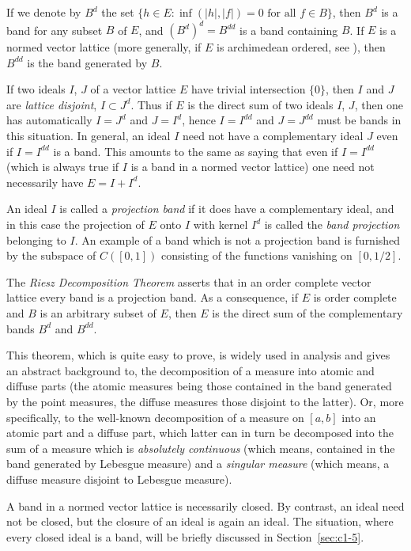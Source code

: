 If we denote by $ B^{d} $ the set $ \{h \in E \colon \inf(|h|,|f|) = 0 \text{ for all } f \in B\} $, then $ B^{d} $ is a band for any subset $ B $ of $ E $, and $ (B^{d})^{d} = B^{dd} $ is a band containing $ B $.
If $ E $ is a normed vector lattice (more generally, if $ E $ is archimedean ordered, see \eg \citet{schaefer:1974}), then $ B^{dd} $ is the band generated by $ B $.

If two ideals $ I $,  $ J $ of a vector lattice $ E $ have trivial intersection $ \{0\} $, then $ I $ and $ J $ are \emph{lattice disjoint}, \ie $ I \subset J^{d} $.
Thus if $ E $ is the direct sum of two ideals $ I $,  $ J $, then one has automatically $ I = J^{d} $ and $ J = I^{d} $, hence $ I = I^{dd} $ and $ J = J^{dd} $ must be bands in this situation.
In general, an ideal $ I $ need not have a complementary ideal $ J $ even if $ I = I^{dd} $ is a band.
This amounts to the same as saying that even if $ I = I^{dd} $ (which is always true if $ I $ is a band in a normed vector lattice) one need not necessarily have $ E = I + I^{d} $.

An ideal $ I $ is called a \emph{projection band} if it does have a complementary ideal, and in this case the projection of $ E $ onto $ I $ with kernel $ I^{d} $ is called the \emph{band projection} belonging to $ I $.
An example of a band which is not a projection band is furnished by the subspace of $ C([0,1]) $ consisting of the functions vanishing on $ [0,1/2] $.

The \emph{Riesz Decomposition Theorem} asserts that in an order complete vector lattice every band is a projection band.
As a consequence, if $ E $ is order complete and $ B $ is an arbitrary subset of $ E $, then $ E $ is the direct sum of the complementary bands $ B^{d} $ and $ B^{dd} $.

This theorem, which is quite easy to prove, is widely used in analysis and gives an abstract background to, \eg the decomposition of a measure into atomic and diffuse parts (the atomic measures being those contained in the band generated by the point measures, the diffuse measures those disjoint to the latter). Or, more specifically, to the well-known decomposition of a measure on $ [a,b] $ into an atomic part and a diffuse part, which latter can in turn be decomposed into the sum of a measure which is \emph{absolutely continuous} (which means, contained in the band generated by Lebesgue measure) and a \emph{singular measure} (which means, a diffuse measure disjoint to Lebesgue measure).

A band in a normed vector lattice is necessarily closed.
By contrast, an ideal need not be closed, but the closure of an ideal is again an ideal.
The situation, where every closed ideal is a band, will be briefly discussed in Section~\ref{sec:c1-5}.
